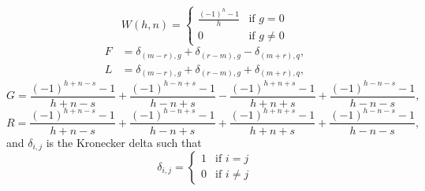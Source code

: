 \begin{equation*}
  W(h,n) = \begin{cases} \frac{\left( -1 \right)^h -1}{h} &\text{if } g = 0 \\
    0& \text{if } g\ne 0
  \end{cases}
\end{equation*}
\begin{align*}
  F &= \delta_{(m-r),g} + \delta_{(r-m),g} - \delta_{(m+r),q}, \\
  L &= \delta_{(m-r),g} + \delta_{(r-m),g} + \delta_{(m+r),q},
\end{align*}
\begin{equation*}
  G = \frac{\left( -1 \right)^{h+n-s}-1}{h+n-s} 
    + \frac{\left( -1 \right)^{h-n+s}-1}{h-n+s}
    - \frac{\left( -1 \right)^{h+n+s}-1}{h+n+s}
    + \frac{\left( -1 \right)^{h-n-s}-1}{h-n-s},
\end{equation*}
\begin{equation*}
  R = \frac{\left( -1 \right)^{h+n-s}-1}{h+n-s} 
    + \frac{\left( -1 \right)^{h-n+s}-1}{h-n+s}
    + \frac{\left( -1 \right)^{h+n+s}-1}{h+n+s}
    + \frac{\left( -1 \right)^{h-n-s}-1}{h-n-s},
\end{equation*}
and $\delta_{i,j}$ is the Kronecker delta such that
\begin{equation*}
  \delta_{i,j} = \begin{cases} 1 & \text{if } i=j \\
    0 & \text{if } i\ne j
  \end{cases}
\end{equation*}
